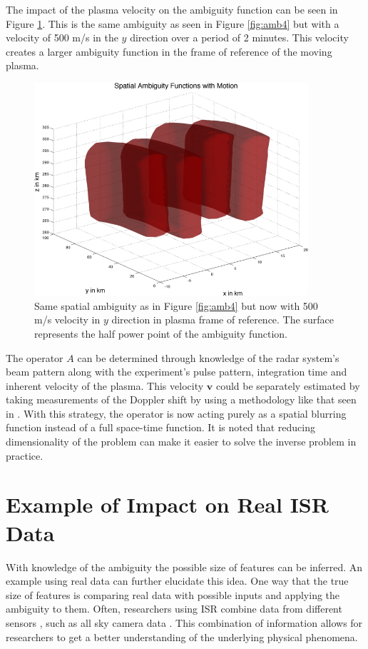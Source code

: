 \noindent The impact of the plasma velocity on the ambiguity function can be seen in Figure \ref{fig:ambtime}. This is the same ambiguity as seen in Figure \ref{fig:amb4} but with a velocity of 500 m/s in the $y$ direction over a period of 2 minutes. This velocity creates a larger ambiguity function in the frame of reference of the moving plasma.

\begin{figure}[!t]
	\centering
	\includegraphics[width=4in]{spaceambmoving}
	\caption{Same spatial ambiguity as in Figure \ref{fig:amb4} but now with 500 m/s velocity in $y$ direction in plasma frame of reference. The surface represents the half power point of the ambiguity function.}
	\label{fig:ambtime}
\end{figure}

The operator $A$ can be determined through knowledge of the radar system's beam pattern along with the experiment's pulse pattern, integration time and inherent velocity of the plasma. This velocity $\mathbf{v}$ could be separately estimated by taking measurements of the Doppler shift by using a methodology like that seen in \cite{butler:imagingfregiondrifts}. With this strategy, the operator is now acting purely as a spatial blurring function instead of a full space-time function. It is noted that reducing dimensionality of the problem can make it easier to solve the inverse problem in practice.

\section{Example of Impact on Real ISR Data}

With knowledge of the ambiguity the possible size of features can be inferred. An example using real data can further elucidate this idea. One way that the true size of features is comparing real data with possible inputs and applying the ambiguity to them. Often, researchers using ISR combine data from different sensors \cite{Dahlgren:2012dq}, such as all sky camera data \cite{Shiokawa1999,GRL:GRL21871,Shiokawa2009}. This combination of information allows for researchers to get a better understanding of the underlying physical phenomena.

